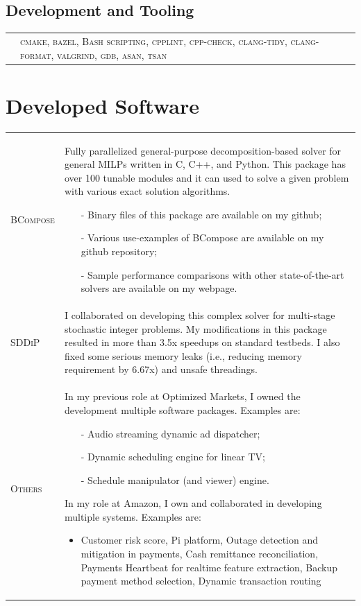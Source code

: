 \documentclass[10PT,letter]{article}
\newcommand{\subsectionstyle}[1]{\normalfont\selectfont\textcolor{titlecol}{\sffamily #1}}
\newcommand{\numbox}[1]{} %
\begin{document}
        \subsection*{\subsectionstyle{Development and Tooling}}
        		\begin{tabular}{p{.2in}p{5.55in}}
        			& 	\textsc{cmake, bazel, Bash scripting,  cpplint, cpp-check, clang-tidy, clang-format, valgrind, gdb, asan, tsan} 
        		\end{tabular}


\section*{\numbox{9}\bfseries\textcolor{titlecol}{\sffamily Developed Software}}
			\begin{tabular}{p{1.2in}p{5.55in}}
				\textsc{BCompose} &  
												Fully parallelized general-purpose decomposition-based solver for general MILPs written in C, C++, and Python. This package has over 100 tunable modules and it can used to solve a given problem with various exact solution algorithms.
												\begin{itemize}
													\item[-] Binary files of this package are available on my github;
													\item[-] Various use-examples of BCompose are available on my github repository; 
													\item[-] Sample performance comparisons with other state-of-the-art solvers are available on my webpage. 
												\end{itemize}\\[.5mm]
				\textsc{SDDiP} & 
												I collaborated on developing  this complex solver for multi-stage stochastic integer problems. My modifications in this package resulted in more than 3.5x speedups   on  standard  testbeds.  I  also fixed some serious memory leaks (i.e., reducing memory requirement by 6.67x) and unsafe threadings. \\[.5mm]
				\textsc{Others} & 
												In my previous role at Optimized Markets, I owned the development multiple software packages. Examples are:
												\begin{itemize}
													\item[-] Audio streaming dynamic ad dispatcher;
													\item[-] Dynamic scheduling engine for linear TV;
													\item[-] Schedule manipulator (and viewer) engine. 
												\end{itemize}
											In my role at Amazon,  I own and collaborated in developing multiple systems. Examples are:
											\begin{itemize}
												\item Customer risk score,  Pi platform, Outage detection and mitigation in payments, Cash remittance  reconciliation, Payments Heartbeat for realtime feature extraction,  Backup payment method selection, Dynamic transaction routing
											\end{itemize}
												  \\[.5mm]
			\end{tabular}
\end{document}
